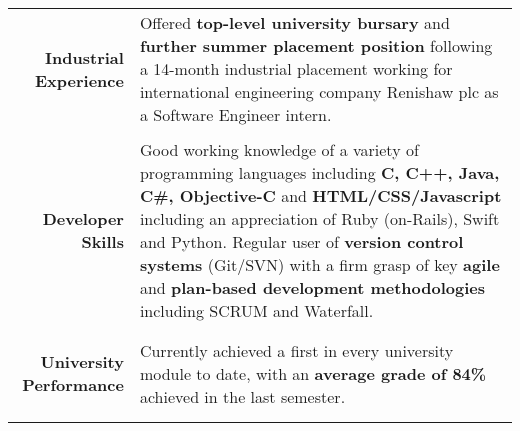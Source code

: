 \documentclass[a4paper, 10pt]{extarticle} %
\begin{document}
\begin{small}
\begin{tabular}{r | p{12cm}}

		\begin{minipage}[t]{2.5cm}
		\begin{flushright}
			\textbf{Industrial Experience}
		\end{flushright}
		\end{minipage} 
		
		& 
		
		Offered \textbf{top-level university bursary} and \textbf{further summer placement position} following a 14-month industrial placement working for international engineering company Renishaw plc as a Software Engineer intern.\\

	\multicolumn{2}{c}{} \\
	
		\begin{minipage}[t]{2.5cm}
		\begin{flushright}
			\textbf{Developer Skills}
		\end{flushright}
		\end{minipage} 
		
		& 
		
		Good working knowledge of a variety of programming languages including \textbf{C, C++, Java, C\#, Objective-C} and \textbf{HTML/CSS/Javascript} including an appreciation of Ruby (on-Rails), Swift and Python. Regular user of \textbf{version control systems} (Git/SVN) with a firm grasp of key \textbf{agile} and \textbf{plan-based development methodologies} including SCRUM and Waterfall.  \\
		
		\multicolumn{2}{c}{} \\
	
		\begin{minipage}[t]{2.5cm}
		\begin{flushright}
			\textbf{University Performance}
		\end{flushright}
		\end{minipage} 
		
		& 
		
		Currently achieved a first in every university module to date, with an \textbf{average grade of 84\%} achieved in the last semester.\\
		
		\multicolumn{2}{c}{} \\


\end{tabular}
\end{small}
\end{document}

